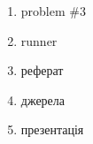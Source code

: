 \begin{enumerate}
    \item problem \#3
    \item runner
    \item реферат
    \item джерела
    \item презентація
\end{enumerate} 